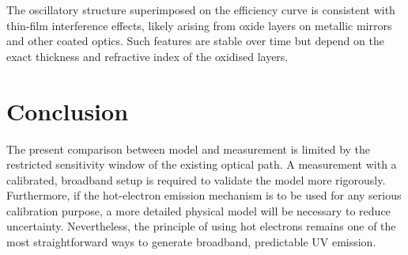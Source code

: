 \documentclass[
	parskip=half,
	a4paper,
]{scrarticle}
\begin{document}
The oscillatory structure superimposed on the efficiency curve is consistent with thin-film interference effects, likely arising from oxide layers on metallic mirrors and other coated optics. Such features are stable over time but depend on the exact thickness and refractive index of the oxidised layers.

\section{Conclusion}
The present comparison between model and measurement is limited by the restricted sensitivity window of the existing optical path. A measurement with a calibrated, broadband setup is required to validate the model more rigorously. Furthermore, if the hot-electron emission mechanism is to be used for any serious calibration purpose, a more detailed physical model will be necessary to reduce uncertainty.  
Nevertheless, the principle of using hot electrons remains one of the most straightforward ways to generate broadband, predictable UV emission.


\clearpage
\printbibliography
\end{document}
